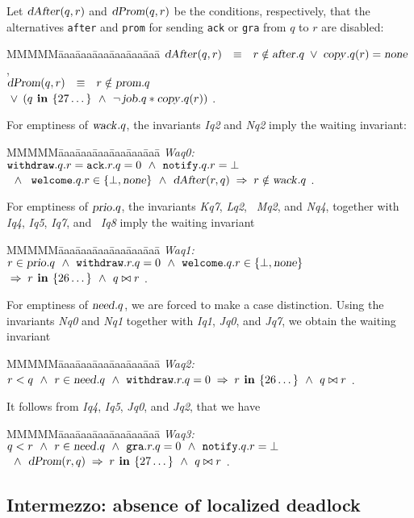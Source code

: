 \documentclass[10pt]{article} \usepackage[english]{babel}
\newenvironment{tab}{\begin{tabbing}
MMMMM\=aaa\=aaa\=aaa\=aaa\=aaa\=aaa\= \kill}{\end{tabbing}}
\def\S #1/{\mbox {\textsl{#1}}}
\def\B #1/{\mbox {\textbf{#1}}}
\def\T #1/{\mbox {\texttt{#1}}}
\def\Implies{\;\Rightarrow\;}
\def\EQ     {\mbox{\quad$\equiv$\quad}}
\def\Land   {\mbox{ $\;\land\;$ }}
\def\Lor    {\;\lor\;}
\begin{document}
Let $\S dAfter/ (q,r)$ and $\S dProm/(q,r)$ be the conditions,
respectively, that the alternatives \T after/ and \T prom/ for sending
\T ack/ or \T gra/ from $q$ to $r$ are disabled:
\begin{tab}
\> $ \S dAfter/(q, r) \EQ r\notin\S after/.q\Lor 
\S copy/.q(r) = \S none/ $ ,\\
\> $ \S dProm/(q, r)\EQ r\notin\S prom/.q $\\
\>\>\> $ \Lor\,(q \B\ in /\{27\dots\}\Land 
\neg\,\S job/.q * \S copy/.q(r) ) $ .
\end{tab}

For emptiness of $\S wack/.q$, the invariants \S Iq2/ and \S Nq2/
imply the {waiting invariant}:
\begin{tab}
\S Waq0:/ \> $ \T withdraw/.q.r = \T ack/.r.q = 0\Land 
\T notify/.q.r =  \bot $\\
\> $ \Land\: \T welcome/.q.r \in\{\bot, \S none/\} \Land
\S dAfter/(r, q) \Implies r\notin\S wack/.q $ .
\end{tab}

For emptiness of $\S prio/.q$, the invariants \S Kq7/, \S Lq2/, \S
Mq2/, and \S Nq4/, together with \S Iq4/, \S Iq5/, \S Iq7/, and \S
Iq8/ imply the waiting invariant
\begin{tab}
\S Waq1:/ \> $ r\in \S prio/.q \Land \T withdraw/.r.q = 0 
\Land \T welcome/.q.r \in\{ \bot, \S none/\} $ \\
\> $ \Implies r \B\ in / \{26 \dots\}\Land q\bowtie r$ .
\end{tab}

For emptiness of $\S need/.q$, we are forced to make a case
distinction.  Using the invariants \S Nq0/ and \S Nq1/ together with
\S Iq1/, \S Jq0/, and \S Jq7/, we obtain the waiting invariant
\begin{tab}
\S Waq2:/ \> $ r < q \Land r\in \S need/.q \Land \T withdraw/.r.q = 0 
\Implies r\B\ in / \{26\dots\}\Land q\bowtie r$ .
\end{tab}

It follows from \S Iq4/, \S Iq5/, \S Jq0/, and \S Jq2/, that we have
\begin{tab}
\S Waq3:/ \> $ q < r \Land r\in\S need/.q\Land \T gra/.r.q = 0 
\Land \T notify/.q.r = \bot $ \\
\> $ \Land \S dProm/(r, q) \Implies r \B\ in /\{27\dots\}\Land q \bowtie r$ .
\end{tab}

\subsection{Intermezzo: absence of localized deadlock} \label{nolocdead}
\end{document}
